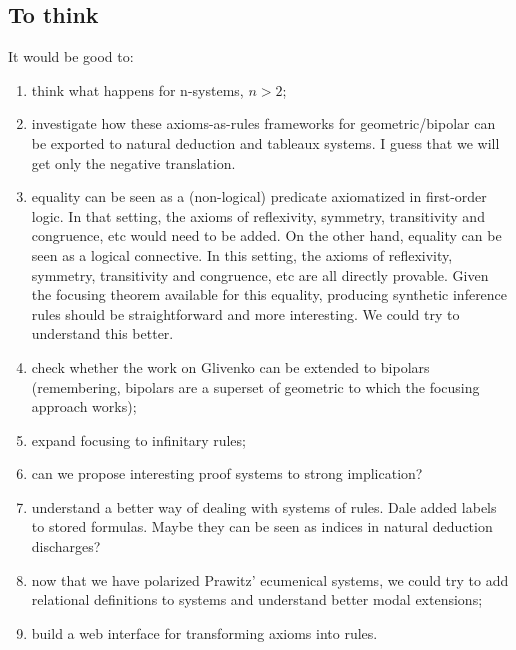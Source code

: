 \subsection{To think}
It would be good to:
\begin{enumerate}
\item think what happens for n-systems, $n>2$;
\item  investigate how these axioms-as-rules frameworks for geometric/bipolar can be exported to natural deduction and tableaux systems. I guess that we will get only the negative translation.
\item equality can be seen as a (non-logical) predicate axiomatized in first-order logic.  In that setting, the axioms of reflexivity, symmetry, transitivity and congruence, etc would need to be added. On the other hand, equality can be seen as a logical connective.  In this setting, the axioms of reflexivity, symmetry, transitivity and congruence, etc are all directly provable. Given the focusing theorem available for this equality, producing synthetic inference rules should be straightforward and more interesting. We could try to understand this better.
\item check whether the work on Glivenko can be extended to bipolars (remembering, bipolars are a superset of geometric to which the focusing approach works);
\item expand focusing to infinitary rules;
\item can we propose interesting proof systems to strong implication?
\item understand a better way of dealing with systems of rules. Dale  added labels to stored formulas. Maybe they can be seen as indices in natural deduction discharges?
\item now that we have polarized Prawitz' ecumenical systems, we could try to add relational definitions to systems and understand better modal extensions;
\item build a web interface for transforming axioms into rules.
\end{enumerate}
